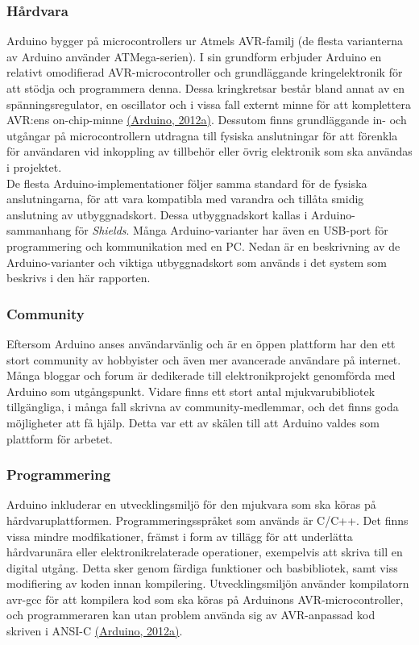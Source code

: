 \documentclass[a4paper,11pt]{article}
\begin{document}
\subsubsection{Hårdvara}
Arduino bygger på microcontrollers ur Atmels AVR-familj (de flesta varianterna av Arduino använder ATMega-serien). I sin grundform erbjuder Arduino en relativt omodifierad AVR-microcontroller och grundläggande kringelektronik för att stödja och programmera denna. Dessa kringkretsar består bland annat av en spänningsregulator, en oscillator och i vissa fall externt minne för att komplettera AVR:ens on-chip-minne \hyperref[arduino]{(Arduino, 2012a)}. Dessutom finns grundläggande in- och utgångar på microcontrollern utdragna till fysiska anslutningar för att förenkla för användaren vid inkoppling av tillbehör eller övrig elektronik som ska användas i projektet. \\

De flesta Arduino-implementationer följer samma standard för de fysiska anslutningarna, för att vara kompatibla med varandra och tillåta smidig anslutning av utbyggnadskort. Dessa utbyggnadskort kallas i Arduino-sammanhang för {\it Shields}. Många Arduino-varianter har även en USB-port för programmering och kommunikation med en PC. Nedan är en beskrivning av de Arduino-varianter och viktiga utbyggnadskort som används i det system som beskrivs i den här rapporten.

\subsubsection{Community}
Eftersom Arduino anses användarvänlig och är en öppen plattform har den ett stort community av hobbyister och även mer avancerade användare på internet. Många bloggar och forum är dedikerade till elektronikprojekt genomförda med Arduino som utgångspunkt. Vidare finns ett stort antal mjukvarubibliotek tillgängliga, i många fall skrivna av community-medlemmar, och det finns goda möjligheter att få hjälp. Detta var ett av skälen till att Arduino valdes som plattform för arbetet. \\

\subsubsection{Programmering}	
Arduino inkluderar en utvecklingsmiljö för den mjukvara som ska köras på hårdvaruplattformen. Programmeringsspråket som används är C/C++. Det finns vissa mindre modfikationer, främst i form av tillägg för att underlätta hårdvarunära eller elektronikrelaterade operationer, exempelvis att skriva till en digital utgång. Detta sker genom färdiga funktioner och basbibliotek, samt viss modifiering av koden innan kompilering. Utvecklingsmiljön använder kompilatorn avr-gcc för att kompilera kod som ska köras på Arduinons AVR-microcontroller, och programmeraren kan utan problem använda sig av AVR-anpassad kod skriven i ANSI-C \hyperref[arduino]{(Arduino, 2012a)}.
\end{document}
